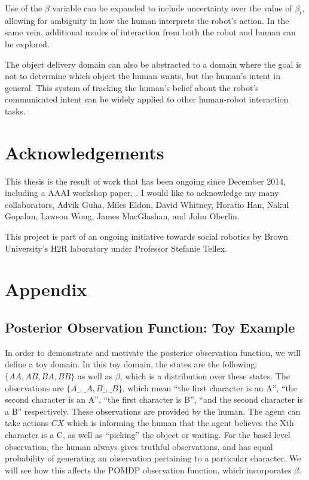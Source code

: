 \documentclass[conference]{IEEEtran}
\begin{document}
Use of the $\beta$ variable can be expanded to include uncertainty over the value of $\beta_t$, allowing for ambiguity in how the human interprets the robot's action. In the same vein, additional modes of interaction from both the robot and human can be explored. 

The object delivery domain can also be abstracted to a domain where the goal is not to determine which object the human wants, but the human's intent in general. This system of tracking the human's belief about the robot's communicated intent can be widely applied to other human-robot interaction tasks. 



\section{Acknowledgements}

This thesis is the result of work that has been ongoing since December 2014, including a AAAI workshop paper, \cite{socialfeedback}.  I would like to acknowledge my many collaborators, Advik Guha, Miles Eldon, David Whitney, Horatio Han, Nakul Gopalan, Lawson Wong, James MacGlashan, and John Oberlin. 

This project is part of an ongoing initiative towards social robotics by Brown University's H2R laboratory under Professor Stefanie Tellex. 


\newpage
\section{Appendix}

\subsection{Posterior Observation Function: Toy Example}
In order to demonstrate and motivate the posterior observation function, we will define a toy domain. In this toy domain, the states are the following: $\{AA, AB, BA, BB\}$ as well as $\beta$, which is a distribution over these states. The observations are $\{A\_, \_A, B\_, \_B\}$, which mean ``the first character is an A'', ``the second character is an A'', ``the first character is B'', ``and the second character is a B'' respectively. These observations are provided by the human. The agent can take actions $CX$ which is informing the human that the agent believes the Xth character is a C, as well as ``picking'' the object or waiting. For the basel level observation, the human always gives truthful observations, and has equal probability of generating an observation pertaining to a particular character. We will see how this affects the POMDP observation function, which incorporates $\beta$. 
\end{document}
